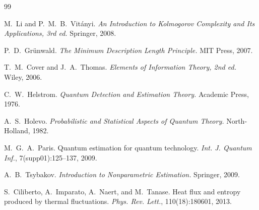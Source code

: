\documentclass[12pt,a4paper]{article}
\theoremstyle{plain}
\theoremstyle{definition}
\begin{document}

\begin{thebibliography}{99}

M.~Li and P.~M.~B.~Vit\'anyi.
\textit{An Introduction to Kolmogorov Complexity and Its Applications, 3rd ed.}
Springer, 2008.

P.~D.~Gr\"unwald.
\textit{The Minimum Description Length Principle.}
MIT Press, 2007.

T.~M.~Cover and J.~A.~Thomas.
\textit{Elements of Information Theory, 2nd ed.}
Wiley, 2006.

C.~W.~Helstrom.
\textit{Quantum Detection and Estimation Theory.}
Academic Press, 1976.

A.~S.~Holevo.
\textit{Probabilistic and Statistical Aspects of Quantum Theory.}
North-Holland, 1982.

M.~G.~A.~Paris.
Quantum estimation for quantum technology.
\textit{Int. J. Quantum Inf.}, 7(supp01):125--137, 2009.

A.~B.~Tsybakov.
\textit{Introduction to Nonparametric Estimation.}
Springer, 2009.

S.~Ciliberto, A.~Imparato, A.~Naert, and M.~Tanase.
Heat flux and entropy produced by thermal fluctuations.
\textit{Phys. Rev. Lett.}, 110(18):180601, 2013.

\end{thebibliography}
\end{document}
